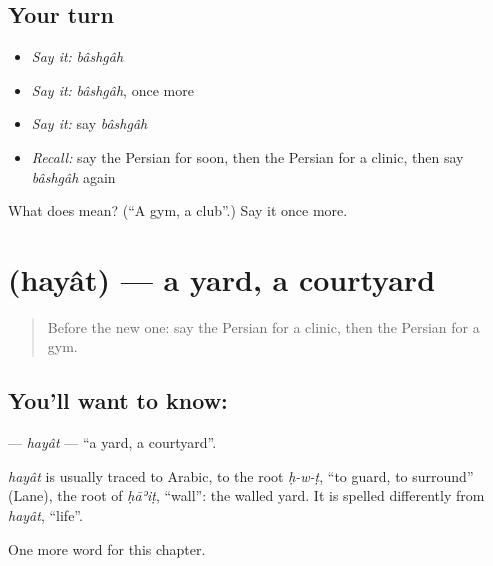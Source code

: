 \subsection*{Your turn}
\begin{itemize}
\raggedright
  \item \emph{Say it:} \emph{bâshgâh}
  \item \emph{Say it:} \emph{bâshgâh}, once more
  \item \emph{Say it:} say \emph{bâshgâh}
  \item \emph{Recall:} say the Persian for soon, then the Persian for a clinic, then say \emph{bâshgâh} again
\end{itemize}

\begin{tcolorbox}[breakable,colback=teal!4,colframe=teal!35!black,title={Before you move on}]
What does  mean? (\textquotedblleft{}A gym, a club\textquotedblright{}.) Say it once more.
\end{tcolorbox}
\section[\texorpdfstring{\fa{حیاط} (hayât)}{حیاط (hayât)}]{ (hayât) — a yard, a courtyard}

\label{lesson:FA-C193-hayat}



\begin{quote}
Before the new one: say the Persian for a clinic, then the Persian for a gym.
\end{quote}

\subsection*{You'll want to know: }
\textbf{} — \emph{hayât} — \textquotedblleft{}a yard, a courtyard\textquotedblright{}.

\begin{cousinweb}
\emph{hayât} is usually traced to Arabic, to the root \emph{ḥ-w-ṭ}, \textquotedblleft{}to guard, to surround\textquotedblright{} (Lane), the root of \emph{ḥāʾiṭ}, \textquotedblleft{}wall\textquotedblright{}: the walled yard. It is spelled differently from \emph{hayât}, \textquotedblleft{}life\textquotedblright{}.
\end{cousinweb}

\begin{grammarlens}[title={What you've built}]
One more word for this chapter.
\end{grammarlens}

